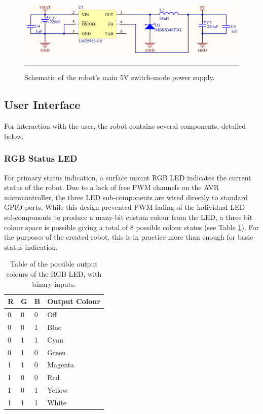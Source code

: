 \begin{figure}[tbph]
	\centering
		\includegraphics[width=150mm]{./Figures/MainPowerSupply.png}
	\rule{35em}{0.5pt}
	\caption[Main Power Supply Schematic]{Schematic of the robot's main 5V switch-mode power supply.}
	\label{fig:mainpowersupply}
\end{figure}

\FloatBarrier
\subsection{User Interface}

For interaction with the user, the robot contains several components, detailed below.

\FloatBarrier
\subsubsection{RGB Status LED}

For primary status indication, a surface mount RGB LED indicates the current status of the robot. Due to a lack of free PWM channels on the AVR microcontroller, the three LED sub-components are wired directly to standard GPIO ports. While this design prevented PWM fading of the individual LED subcomponents to produce a many-bit custom colour from the LED, a three bit colour space is possible giving a total of 8 possible colour states (see Table \ref{tab:rgbcolours}). For the purposes of the created robot, this is in practice more than enough for basic status indication.

\begin{table}[H]
	\begin{center}
		\begin{tabular}{ | l | l | l | l |}
			\hline
			\textbf{R}	& \textbf{G} & \textbf{B} & \textbf{Output Colour} \\ \hline

			0 & 0 & 0 & Off		\\ \hline
			0 & 0 & 1 & Blue	\\ \hline
			0 & 1 & 1 & Cyan	\\ \hline
			0 & 1 & 0 & Green	\\ \hline
			1 & 1 & 0 & Magenta	\\ \hline
			1 & 0 & 0 & Red		\\ \hline
			1 & 0 & 1 & Yellow	\\ \hline
			1 & 1 & 1 & White	\\ \hline
		\end{tabular}
		\caption[RGB LED Colour Table]{Table of the possible output colours of the RGB LED, with binary inputs.}
		\label{tab:rgbcolours}
	\end{center}
\end{table}

